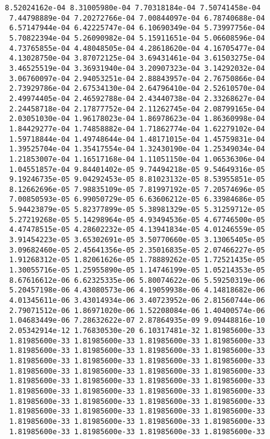 \documentclass[11pt]{article}
\begin{document}
\begin{Verbatim}[commandchars=\\\{\}]
 8.52024162e-04 8.31005980e-04 7.70318184e-04 7.50741458e-04
 7.44798889e-04 7.20272766e-04 7.00844097e-04 6.78740688e-04
 6.57147944e-04 6.42225747e-04 6.10690349e-04 5.73997756e-04
 5.70822394e-04 5.26090982e-04 5.15911651e-04 5.06608596e-04
 4.73765855e-04 4.48048505e-04 4.28618620e-04 4.16705477e-04
 4.13028750e-04 3.87072125e-04 3.69431461e-04 3.61503275e-04
 3.46525519e-04 3.36931940e-04 3.20907323e-04 3.14292032e-04
 3.06760097e-04 2.94053251e-04 2.88843957e-04 2.76750866e-04
 2.73929786e-04 2.67534130e-04 2.64796410e-04 2.52610570e-04
 2.49974405e-04 2.46592788e-04 2.43440738e-04 2.33268627e-04
 2.24458718e-04 2.17877752e-04 2.11262745e-04 2.08799165e-04
 2.03051030e-04 1.96178023e-04 1.86978623e-04 1.86360998e-04
 1.84429277e-04 1.74858882e-04 1.71862774e-04 1.62279102e-04
 1.59718844e-04 1.49748644e-04 1.48171015e-04 1.45759831e-04
 1.39525704e-04 1.35417554e-04 1.32430190e-04 1.25349034e-04
 1.21853007e-04 1.16517168e-04 1.11051150e-04 1.06536306e-04
 1.04551857e-04 9.84401402e-05 9.74494218e-05 9.54649316e-05
 9.19246735e-05 9.04292453e-05 8.81023132e-05 8.53955851e-05
 8.12662696e-05 7.98835109e-05 7.81997192e-05 7.20574696e-05
 7.00850593e-05 6.99050729e-05 6.63606212e-05 6.33984686e-05
 5.94423879e-05 5.82377899e-05 5.38981329e-05 5.31259712e-05
 5.27219268e-05 5.14298964e-05 4.93494536e-05 4.67746500e-05
 4.47478515e-05 4.28602232e-05 4.13941834e-05 4.01246559e-05
 3.91454223e-05 3.65302691e-05 3.50770660e-05 3.13065405e-05
 3.09682460e-05 2.45641356e-05 2.35016835e-05 2.07466227e-05
 1.91268312e-05 1.82061626e-05 1.78889262e-05 1.72521435e-05
 1.30055716e-05 1.25955890e-05 1.14746199e-05 1.05214353e-05
 8.67616612e-06 6.62325335e-06 5.80074622e-06 5.59250319e-06
 5.20457198e-06 4.43080573e-06 4.19059938e-06 4.14818682e-06
 4.01345611e-06 3.43014934e-06 3.40723952e-06 2.81560744e-06
 2.79071512e-06 1.86971020e-06 1.52208084e-06 1.40400574e-06
 1.04683449e-06 7.28632622e-07 2.87864935e-09 9.09448816e-10
 2.05342914e-12 1.76830530e-20 6.10317481e-32 1.81985600e-33
 1.81985600e-33 1.81985600e-33 1.81985600e-33 1.81985600e-33
 1.81985600e-33 1.81985600e-33 1.81985600e-33 1.81985600e-33
 1.81985600e-33 1.81985600e-33 1.81985600e-33 1.81985600e-33
 1.81985600e-33 1.81985600e-33 1.81985600e-33 1.81985600e-33
 1.81985600e-33 1.81985600e-33 1.81985600e-33 1.81985600e-33
 1.81985600e-33 1.81985600e-33 1.81985600e-33 1.81985600e-33
 1.81985600e-33 1.81985600e-33 1.81985600e-33 1.81985600e-33
 1.81985600e-33 1.81985600e-33 1.81985600e-33 1.81985600e-33
 1.81985600e-33 1.81985600e-33 1.81985600e-33 1.81985600e-33
 1.81985600e-33 1.81985600e-33 1.81985600e-33 1.81985600e-33

\end{Verbatim}
\end{document}
